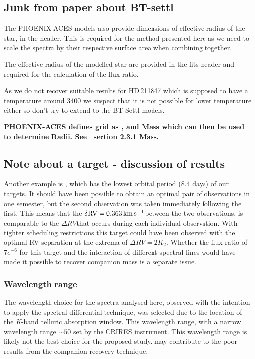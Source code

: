\subsection{Junk from paper about BT-settl}

The {PHOENIX-ACES} models also provide dimensions of effective radius of the star, in the header.
This is required for the method presented here as we need to scale the spectra by their respective surface area when combining together.


The effective radius of the modelled star are provided in the fits header and required for the calculation of the flux ratio.


As we do not recover suitable results for HD\,211847 which is supposed to have a temperature around 3400\K{} we suspect that it is not possible for lower temperature either so don't try to extend to the {BT-Settl} models.


\textbf{
     {PHOENIX-ACES} defines grid as \Teff{}, \logg{} and Mass which can then be used to determine Radii.
See~\citep{husser_new_2013} section 2.3.1 Mass.}




\subsection{Note about a target - discussion of results}
Another example is , which has the lowest orbital period (8.4 days) of our targets.
It should have been possible to obtain an optimal pair of observations in one semester, but the second observation was taken immediately following the first.
This means that the \(\rm \delta {RV} = 0.363\,\si{\kilo\metre\per\second}{}\)between the two observations, is comparable to the \(\Delta {RV}\)that occurs during each individual observation.
With tighter scheduling restrictions this target could have been observed with the optimal {RV} separation at the extrema of \(\Delta {RV}=2 K_{2}\).
Whether the flux ratio of \(7e^{-6}\) for this target and the interaction of different spectral lines would have made it possible to recover companion mass is a separate issue.



\subsubsection{Wavelength range}
The wavelength choice for the spectra analysed here, observed with the intention to apply the spectral differential technique, was selected due to the location of the \emph{K}-band telluric absorption window.
This wavelength range, with a narrow wavelength range \(\sim50\)\nm{} set by the {CRIRES} instrument.
This wavelength range is likely not the best choice for the proposed study.  may contribute to the poor results from the companion recovery technique.

